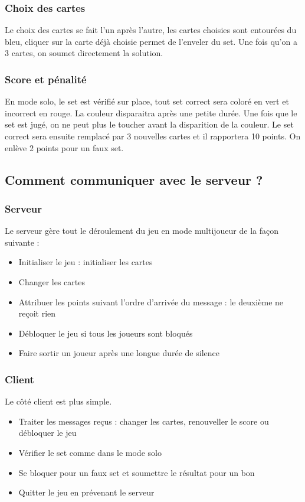 \documentclass[paper=a4, french]{scrartcl} %
\begin{document}
\subsubsection{Choix des cartes}
Le choix des cartes se fait l'un après l'autre, les cartes choisies sont entourées du bleu, cliquer sur la carte déjà choisie permet de l'enveler du set. Une fois qu'on a 3 cartes, on soumet directement la solution.

\subsubsection{Score et pénalité}
En mode solo, le set est vérifié sur place, tout set correct sera coloré en vert et incorrect en rouge. La couleur disparaitra après une petite durée. Une fois que le set est jugé, on ne peut plus le toucher avant la disparition de la couleur. Le set correct sera ensuite remplacé par 3 nouvelles cartes et il rapportera 10 points. On enlève 2 points pour un faux set.
 
\subsection{Comment communiquer avec le serveur ?}

\subsubsection{Serveur}
Le serveur gère tout le déroulement du jeu en mode multijoueur de la façon suivante : 
\begin{itemize}
\item Initialiser le jeu : initialiser les cartes
\item Changer les cartes 
\item Attribuer les points suivant l'ordre d'arrivée du message : le deuxième ne reçoit rien
\item Débloquer le jeu si tous les joueurs sont bloqués
\item Faire sortir un joueur après une longue durée de silence
\end{itemize}
	
\subsubsection{Client}
Le côté client est plus simple. 
\begin{itemize}
\item Traiter les messages reçus : changer les cartes, renouveller le score ou débloquer le jeu
\item Vérifier le set comme dans le mode solo
\item Se bloquer pour un faux set et soumettre le résultat pour un bon
\item Quitter le jeu en prévenant le serveur
\end{itemize}
	
\end{document}
